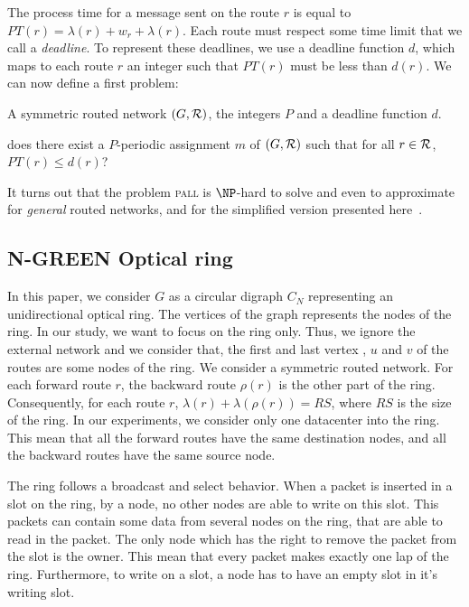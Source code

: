 \documentclass[a4paper,10pt,french,english]{article}
\newcommand\pall{\textsc{pall}\xspace}
\begin{document}
The process time for a message sent on the route $r$ is equal to $PT(r)=\lambda(r)+ w_r+\lambda(r)$. Each route must respect some time limit that we call a \emph{deadline}. To represent these deadlines, 
      we use a deadline function $d$, which maps to each route $r$ an integer such that $PT(r)$ must be less than $d(r)$.
    We can now define a first problem:

      \noindent {\bf Periodic Assignment for Low Latency (\pall)} 

 
        A symmetric routed network $(G,{\cal R})$, the integers $P$ and a deadline function $d$.
      
       does there exist a $P$-periodic assignment $m$ of $(G,{\cal R})$ such that for all $r \in {\cal R}$, $PT(r) \leq d(r)$?

It turns out that the problem \pall is $\NP$-hard to solve and even to approximate for \emph{general} routed networks, and for the simplified version presented here~\cite{latency2017}.      
          
  \subsection{N-GREEN Optical ring}
  In this paper, we consider $G$ as a circular digraph $C_N$ representing an unidirectional optical ring. The vertices of the graph represents the nodes of the ring. In our study, we want to focus on the ring only. Thus, we ignore the external network and we consider that, the first and last vertex , $u$ and $v$ of the routes are some nodes of the ring. We consider a symmetric routed network. For each forward route $r$, the backward route $\rho(r)$ is the other part of the ring. Consequently, for each route $r$, $\lambda(r) + \lambda(\rho(r)) = RS$, where $RS$ is the size of the ring. In our experiments, we consider only one datacenter into the ring. This mean that all the forward routes have the same destination nodes, and all the backward routes have the same source node.

  The ring follows a broadcast and select behavior. When a packet is inserted in a slot on the ring, by a node, no other nodes are able to write on this slot. This packets can contain some data from several nodes on the ring, that are able to read in the packet. The only node which has the right to remove the packet from the slot is the owner. This mean that every packet makes exactly one lap of the ring. Furthermore, to write on a slot, a node has to have an empty slot in it's writing slot.
\end{document}
